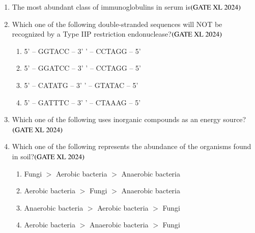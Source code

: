 \documentclass[journal]{IEEEtran}
\begin{document}
\begin{enumerate}
    \item The most abundant class of immunoglobulins in serum is\hfill $\left(\text{GATE XL 2024}\right)$
    \begin{enumerate}
    \end{enumerate}

    \item Which one of the following double-stranded sequences will NOT be recognized by a Type IIP restriction endonuclease?\hfill $\left(\text{GATE XL 2024}\right)$
    \begin{enumerate}
        \item 5' -- GGTACC -- 3' ' -- CCTAGG -- 5'
        \item 5' -- GGATCC -- 3' ' -- CCTAGG -- 5'
        \item 5' -- CATATG -- 3' ' -- GTATAC -- 5'
        \item 5' -- GATTTC -- 3' ' -- CTAAAG -- 5'
    \end{enumerate}

    \item Which one of the following uses inorganic compounds as an energy source?\hfill $\left(\text{GATE XL 2024}\right)$
    \begin{enumerate}
    \end{enumerate}

    \item Which one of the following represents the abundance of the organisms found in soil?\hfill $\left(\text{GATE XL 2024}\right)$
    \begin{enumerate}
        \item Fungi $>$ Aerobic bacteria $>$ Anaerobic bacteria
        \item Aerobic bacteria $>$ Fungi $>$ Anaerobic bacteria
        \item Anaerobic bacteria $>$ Aerobic bacteria $>$ Fungi
        \item Aerobic bacteria $>$ Anaerobic bacteria $>$ Fungi
    \end{enumerate}

\end{enumerate}
\end{document}
